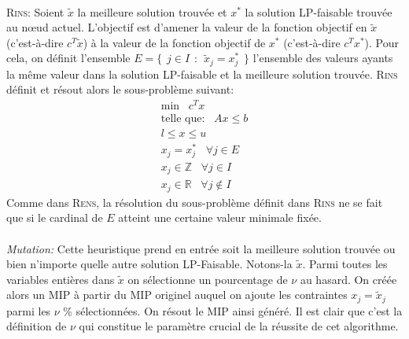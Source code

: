 \documentclass[12pt,a4paper,oneside]{book}
\theoremstyle{definition}
\newcommand{\R}{\mathbb{R}}
\begin{document}
	\paragraph{}
	\textsc{Rins:} Soient $\tilde{x}$ la meilleure solution trouvée et $x^*$ la solution LP-faisable trouvée au nœud actuel. L'objectif est d'amener la valeur de la fonction objectif en $\tilde{x}$ (c'est-à-dire $c^T \tilde{x}$) à la valeur de la fonction objectif de $x^*$ (c'est-à-dire $c^T x^*$). Pour cela, on définit l'ensemble $ E = \{\hspace{5pt} j \in I \hspace{5pt} : \hspace{5pt} \tilde{x}_j = x^*_j \hspace{5pt}\}$ l'ensemble des valeurs ayants la même valeur dans la solution LP-faisable et la meilleure solution trouvée. \textsc{Rins} définit et résout alors le sous-problème suivant:
	\begin{equation}
		\begin{aligned}
			\text{min} \hspace{10pt}  c^T x \\
			\text{telle que:} \hspace{10pt} Ax \leq b \\ 
			l \leq x \leq u \\
			x_j = x^*_j \hspace{10pt} \forall j \in E \\
			x_j \in \mathbb{Z} \hspace{10pt} \forall j \in I \\
			x_j \in \R \hspace{10pt} \forall j \notin I
		\end{aligned}
	\end{equation}
	Comme dans \textsc{Rens}, la résolution du sous-problème définit dans \textsc{Rins} ne se fait que si le cardinal de $E$ atteint une certaine valeur minimale fixée.
	
	\paragraph{}
	\textit{Mutation:} Cette heuristique prend en entrée soit la meilleure solution trouvée ou bien n'importe quelle autre solution LP-Faisable. Notons-la $\tilde{x}$.
	Parmi toutes les variables entières dans $\tilde{x}$ on sélectionne un pourcentage de $\nu $ au hasard. On créée alors un MIP à partir du MIP originel auquel on ajoute les contraintes $ x_j  = \tilde{x}_j$ parmi les $\nu$ \% sélectionnées. On résout le MIP ainsi généré. Il est clair que c'est la définition de $\nu$ qui constitue le paramètre crucial de la réussite de cet algorithme. 
		
\end{document}
